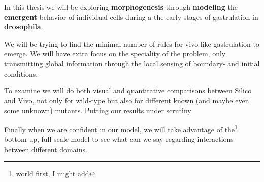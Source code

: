 In this thesis we will be exploring \textbf{morphogenesis} through \textbf{modeling} the \textbf{emergent} behavior of individual cells during a the early stages of  gastrulation in \textbf{drosophila}.

We will be trying to find the minimal number of rules for vivo-like gastrulation to emerge. We will have extra focus on the speciality of the problem, only transmitting global information through the local sensing of boundary- and initial conditions.

To examine we will do both visual and quantitative comparisons between Silico and Vivo, not only for wild-type but also for different known (and maybe even some unknown) mutants. Putting our results under scrutiny 

Finally when we are confident in our model, we will take advantage of the\footnote{world first, I might add} bottom-up, full scale model to see what can we say regarding interactions between different domains.\\






